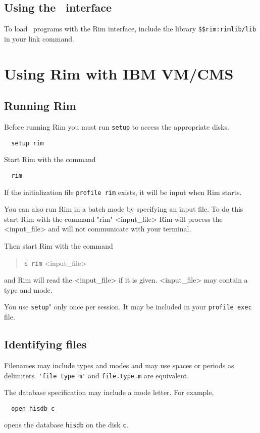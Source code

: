 \documentclass[11pt,a4paper]{report}
\begin{document}
 
\subsection{Using the \Fortran\ interface}
%
To load \Fortran\ programs with the Rim interface, include the
library \verb!$$rim:rimlib/lib!
in your link command.
 
\section{Using Rim with IBM VM/CMS}
%
 
\subsection{Running Rim}
Before running Rim you must run \verb!setup! to access the appropriate disks.
\begin{verbatim}
  setup rim
\end{verbatim}
 
Start Rim with the command
\begin{verbatim}
  rim
\end{verbatim}
If the initialization file \verb!profile rim! exists, it will
be input when Rim starts.
 
You can also run Rim in a batch mode by specifying an input file.
To do this start Rim with the command
"rim" <input\_file>
Rim will process the <input\_file> and will not communicate
with your terminal.
 
 
Then start Rim with the command
\begin{verse}
  \verb!$ rim! <input\_file>
\end{verse}
and Rim will read the <input\_file> if it is given.
<input\_file> may contain a type and mode.
 
You use \verb!setup!" only once per session.  It may be included in your
\verb!profile exec! file.
 
\subsection{Identifying files}
%
Filenames may include types and modes and may use spaces or periods
as delimiters.
\verb!'file type m'! and \verb!file.type.m!
are equivalent.
 
The database specification may include a mode letter.
For example,
\begin{verbatim}
  open hisdb c
\end{verbatim} 
opens the database \verb!hisdb! on the disk \verb!c!.
 
\end{document}

